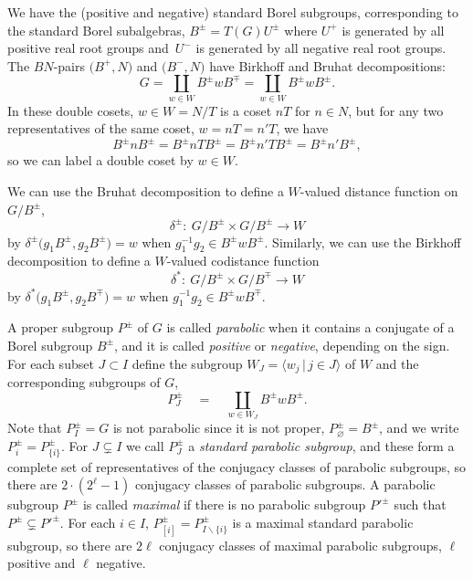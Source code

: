 \documentclass[11pt]{article}
\numberwithin{equation}{section}
\numberwithin{equation}{section}
\def\la{\langle}
\def\ra{\rangle}
\begin{document}
We have the (positive and negative) standard Borel subgroups, corresponding to the standard Borel subalgebras, $B^{\pm}=T(G)U^{\pm}$ where $U^{+}$ is generated by all positive real root groups and~$U^-$ is generated by all negative real root groups. The $BN$-pairs $\big(B^+,N\big)$ and $\big(B^-,N\big)$ have Birkhoff and Bruhat decompositions:
\[G = \coprod_{w\in W} B^{\pm}wB^{\mp} = \coprod_{w\in W}B^{\pm}wB^{\pm}.\]
In these double cosets, $w\in W = N/T$ is a coset $nT$ for $n\in N$, but for any two representatives of the same coset, $w = nT = n'T$, we have
\[B^{\pm}nB^{\pm} = B^{\pm}nTB^{\pm} = B^{\pm}n'TB^{\pm} = B^{\pm}n'B^{\pm},\]
so we can label a double coset by $w\in W$.

We can use the Bruhat decomposition to define a $W$-valued distance function on $G/B^\pm$,
\[\delta^\pm \colon \ G/B^\pm \times G/B^\pm \to W\]
by $\delta^\pm\big(g_1 B^\pm, g_2 B^\pm\big) = w$ when $g_1^{-1} g_2 \in B^{\pm}wB^{\pm}$. Similarly, we can use the
Birkhoff decomposition to define a $W$-valued codistance function
\[\delta^* \colon \ G/B^\pm \times G/B^\mp \to W\]
by $\delta^*\big(g_1 B^\pm, g_2 B^\mp\big) = w$ when $g_1^{-1} g_2 \in B^{\pm}wB^{\mp}$.

A proper subgroup $P^{\pm}$ of $G$ is called {\em parabolic} when it contains a conjugate of a Borel subgroup $B^{\pm}$, and it is called \emph{positive} or \emph{negative}, depending on the sign. For each subset $J\subset I$ define the subgroup
 $W_J = \la w_j \, |\, j\in J\ra$ of $W$ and the corresponding subgroups of $G$,
\[P_J^\pm\quad = \quad \coprod_{w\in W_J}B^{\pm}wB^{\pm} .\]
Note that $P_I^\pm = G$ is not parabolic since it is not proper,
$P_{\varnothing}^\pm = B^{\pm}$, and we write $P_i^\pm = P_{\{i\}}^\pm$. For $J\subsetneq I$ we
call $P_J^\pm$ a {\em standard parabolic subgroup}, and these form a complete set of representatives of the conjugacy classes of parabolic subgroups, so there are $2\cdot (2^\ell-1)$ conjugacy classes of parabolic subgroups. A parabolic subgroup $P^{\pm}$ is called \emph{maximal} if there is no parabolic subgroup $P'^{\pm}$ such that $P^{\pm}\subsetneq P'^{\pm}$. For each $i\in I$,
$P_{[i]}^\pm = P_{I\backslash\{i\}}^\pm$ is a maximal standard parabolic subgroup, so there are $2\ell$ conjugacy classes of maximal parabolic subgroups, $\ell$ positive and $\ell$ negative.
\end{document}

